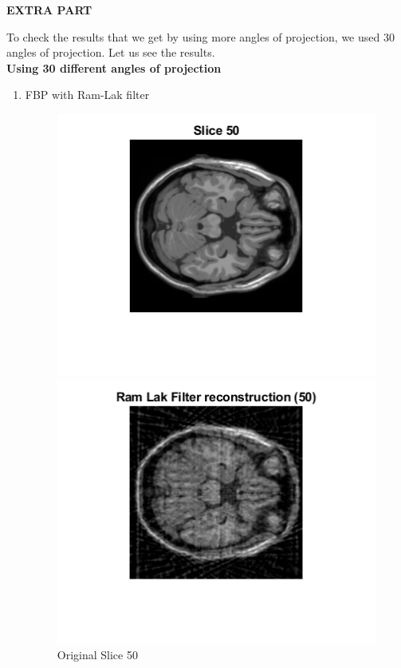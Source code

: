 \documentclass[12pt]{article}
\begin{document}
\textbf{EXTRA PART}

To check the results that we get by using more angles of projection, we used 30 angles of projection. Let us see the results.\\ 
\textbf{Using 30 different angles of projection}
\begin{enumerate}[label = (\alph*)]
    \item FBP with Ram-Lak filter
    \begin{figure}[H]
        \centering
        \begin{minipage}{.45\textwidth}
            \centering
            \includegraphics[width=\linewidth]{Images/Q3_50.png}
            \caption*{Original Slice 50}
        \end{minipage}
        \begin{minipage}{.45\textwidth}
            \centering
            \includegraphics[width=\linewidth]{Images/Q3_Extra_50_a.png}

\end{minipage}
\end{figure}
\end{enumerate}
\end{document}
